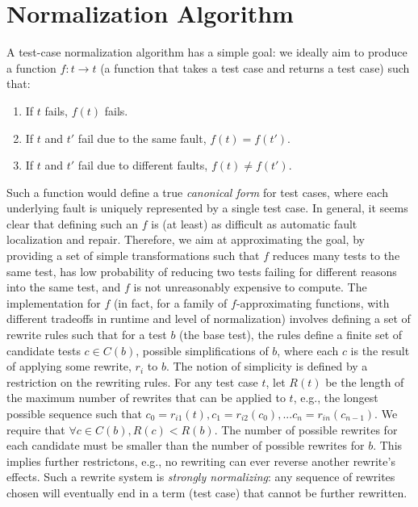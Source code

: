 \section{Normalization Algorithm}

A test-case normalization algorithm has a simple goal:  we ideally aim to
produce a function $f : t \rightarrow t$ (a function that takes a test
case and returns a test case) such that:

\begin{enumerate}
\item If $t$ fails, $f(t)$ fails.
\item If $t$ and $t'$ fail due to the same fault, $f(t) = f(t')$.
\item If $t$ and $t'$ fail due to different faults, $f(t) \not=
  f(t')$.
\end{enumerate}

Such a function would define a true \emph{canonical form} for test cases, where
each underlying fault is uniquely represented by a single test case.
In general, it seems clear that defining such an $f$ is (at least) as
difficult as automatic fault localization and repair.  Therefore, we
aim at approximating the goal, by providing a set of simple
transformations such that $f$ reduces many tests to the same test, has
low probability of reducing two tests failing for different reasons
into the same test, and $f$ is not unreasonably expensive to compute.
The implementation for $f$ (in fact, for a family of $f$-approximating
functions, with different tradeoffs in runtime and level of
normalization) involves defining a set of rewrite rules such that for a
test $b$ (the base test), the rules define a finite set of candidate
tests $c \in C(b)$, possible simplifications of $b$, where each $c$ is
the result of applying some rewrite, $r_i$ to $b$.  The notion of
simplicity is defined by a restriction on the rewriting rules.  For
any test case $t$, let $R(t)$ be the length of the maximum number of
rewrites that can be applied to $t$, e.g., the longest possible
sequence such that $c_0 = r_{i1}(t), c_1 = r_{i2}(c_0), ... c_n = r_{in}(c_{n-1})$. We
require that $\forall c \in C(b), R(c) < R(b)$.  The number of possible
rewrites for each candidate must be smaller than the number of
possible rewrites for $b$.  This implies further restrictons, e.g., no
rewriting can ever reverse another rewrite's effects.  Such a rewrite
system is \emph{strongly normalizing}:  any sequence of rewrites
chosen will eventually end in a term (test case) that cannot be
further rewritten.

